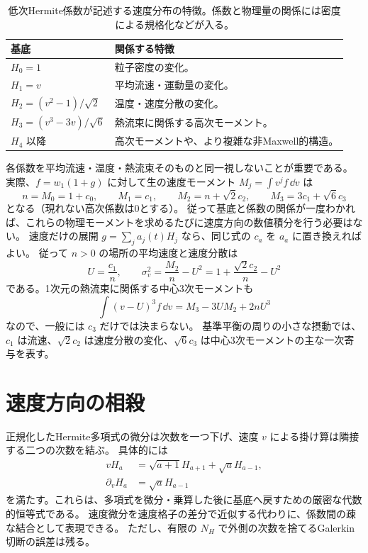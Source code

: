 \begin{table}[htbp]
\centering\small
\caption{低次Hermite係数が記述する速度分布の特徴。係数と物理量の関係には密度による規格化などが入る。}
\begin{tabularx}{\textwidth}{lX}
\toprule 基底 & 関係する特徴 \\\midrule
$H_0=1$ & 粒子密度の変化。\\
$H_1=v$ & 平均流速・運動量の変化。\\
$H_2=(v^2-1)/\sqrt2$ & 温度・速度分散の変化。\\
$H_3=(v^3-3v)/\sqrt6$ & 熱流束に関係する高次モーメント。\\
$H_4$ 以降 & 高次モーメントや、より複雑な非Maxwell的構造。\\
\bottomrule
\end{tabularx}
\end{table}

各係数を平均流速・温度・熱流束そのものと同一視しないことが重要である。
実際、$f=w_1(1+g)$ に対して生の速度モーメント $M_j=\int v^j f\,\dd v$ は
\[
n=M_0=1+c_0,\qquad M_1=c_1,\qquad
M_2=n+\sqrt2c_2,\qquad M_3=3c_1+\sqrt6c_3
\]
となる（現れない高次係数は0とする）。
従って基底と係数の関係が一度わかれば、これらの物理モーメントを求めるたびに速度方向の数値積分を行う必要はない。
速度だけの展開 $g=\sum_j a_j(t)H_j$ なら、同じ式の $c_a$ を $a_a$ に置き換えればよい。
従って $n>0$ の場所の平均速度と速度分散は
\[
U=\frac{c_1}{n},\qquad
\sigma_v^2=\frac{M_2}{n}-U^2=1+\frac{\sqrt2c_2}{n}-U^2
\]
である。1次元の熱流束に関係する中心3次モーメントも
\[
\int(v-U)^3f\,\dd v=M_3-3UM_2+2nU^3
\]
なので、一般には $c_3$ だけでは決まらない。
基準平衡の周りの小さな摂動では、$c_1$ は流速、$\sqrt2c_2$ は速度分散の変化、$\sqrt6c_3$ は中心3次モーメントの主な一次寄与を表す。

\section{速度方向の相殺}
正規化したHermite多項式の微分は次数を一つ下げ、速度 $v$ による掛け算は隣接する二つの次数を結ぶ。
具体的には
\begin{align}
vH_a&=\sqrt{a+1}H_{a+1}+\sqrt a H_{a-1},\\
\partial_vH_a&=\sqrt a H_{a-1}
\end{align}
を満たす。これらは、多項式を微分・乗算した後に基底へ戻すための厳密な代数的恒等式である。
速度微分を速度格子の差分で近似する代わりに、係数間の疎な結合として表現できる。
ただし、有限の $N_H$ で外側の次数を捨てるGalerkin切断の誤差は残る。

